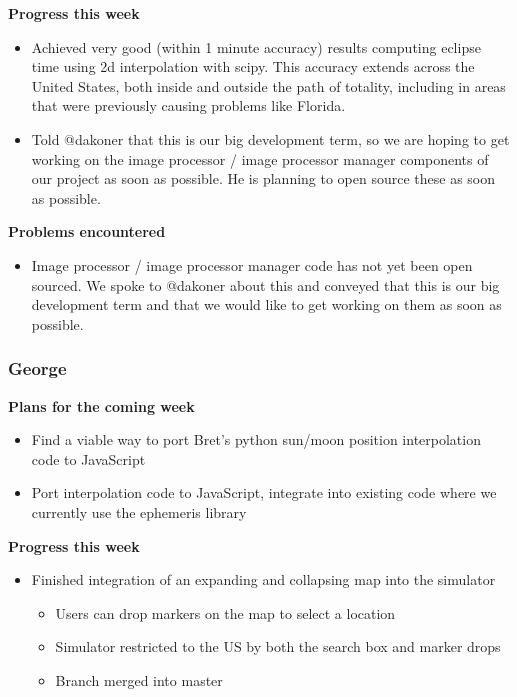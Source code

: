 \documentclass[10pt, onecolumn, draftclsnofoot, letterpaper, compsoc]{IEEEtran}
\begin{document}
    \noindent \textbf{Progress this week}

    \begin{itemize}

    \item Achieved very good (within 1 minute accuracy) results computing eclipse time using 2d interpolation
      with scipy. This accuracy extends across the United States, both inside and outside the path of totality,
      including in areas that were previously causing problems like Florida.
    \item Told @dakoner that this is our big development term, so we are hoping to get working on the image processor /
      image processor manager components of our project as soon as possible. He is planning to open source these as
      soon as possible.

      \end{itemize}

    \noindent \textbf{Problems encountered}

    \begin{itemize}

    \item Image processor / image processor manager code has not yet been open sourced. We spoke to @dakoner about this
      and conveyed that this is our big development term and that we would like to get working on them as soon as
      possible.

      \end{itemize}

    \subsubsection{George}

    \noindent \textbf{Plans for the coming week}

    \begin{itemize}

    \item Find a viable way to port Bret's python sun/moon position interpolation code to JavaScript
    \item Port interpolation code to JavaScript, integrate into existing code where we currently use the ephemeris library

    \end{itemize}

    \noindent \textbf{Progress this week}

    \begin{itemize}

    \item Finished integration of an expanding and collapsing map into the simulator

    \begin{itemize}
      \item Users can drop markers on the map to select a location
      \item Simulator restricted to the US by both the search box and marker drops
      \item Branch merged into master
      \end{itemize}
    \end{itemize}
\end{document}
